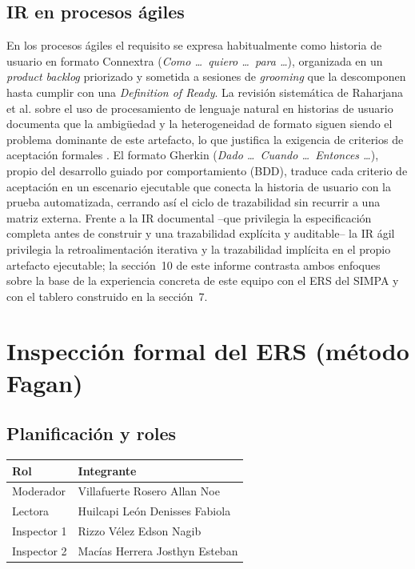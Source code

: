 \documentclass[11pt,a4paper]{article}
\begin{document}
\subsection{IR en procesos ágiles}

En los procesos ágiles el requisito se expresa habitualmente como historia de usuario en formato
Connextra (\emph{Como \dots\ quiero \dots\ para \dots}), organizada en un \emph{product backlog}
priorizado y sometida a sesiones de \emph{grooming} que la descomponen hasta cumplir con una
\emph{Definition of Ready}. La revisión sistemática de Raharjana et al. sobre el uso de
procesamiento de lenguaje natural en historias de usuario documenta que la ambigüedad y la
heterogeneidad de formato siguen siendo el problema dominante de este artefacto, lo que justifica
la exigencia de criterios de aceptación formales \cite{raharjana2021}. El formato Gherkin
(\emph{Dado \dots\ Cuando \dots\ Entonces \dots}), propio del desarrollo guiado por
comportamiento (BDD), traduce cada criterio de aceptación en un escenario ejecutable que conecta
la historia de usuario con la prueba automatizada, cerrando así el ciclo de trazabilidad sin
recurrir a una matriz externa. Frente a la IR documental --que privilegia la especificación
completa antes de construir y una trazabilidad explícita y auditable-- la IR ágil privilegia la
retroalimentación iterativa y la trazabilidad implícita en el propio artefacto ejecutable; la
sección~10 de este informe contrasta ambos enfoques sobre la base de la experiencia concreta de
este equipo con el ERS del SIMPA y con el tablero construido en la sección~7.

\section{Inspección formal del ERS (método Fagan)}

\subsection{Planificación y roles}

\begin{center}
\begin{tabular}{ll}
\toprule
\textbf{Rol} & \textbf{Integrante} \\
\midrule
Moderador & Villafuerte Rosero Allan Noe \\
Lectora & Huilcapi León Denisses Fabiola \\
Inspector 1 & Rizzo Vélez Edson Nagib \\
Inspector 2 & Macías Herrera Josthyn Esteban \\
\bottomrule
\end{tabular}
\end{center}
\end{document}
